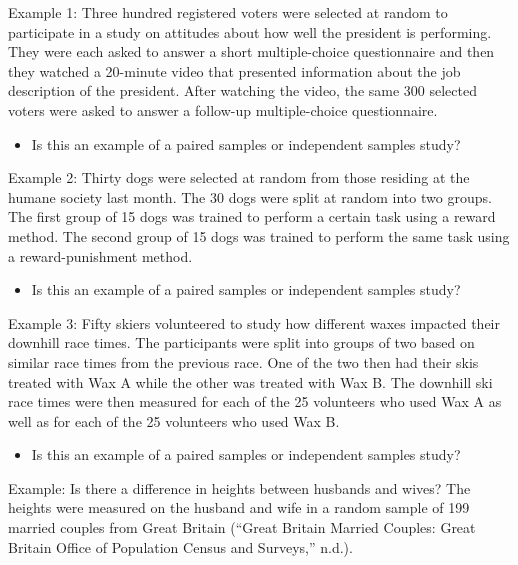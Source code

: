 \documentclass[
]{report}
\providecommand{\tightlist}{%
  \setlength{\itemsep}{0pt}\setlength{\parskip}{0pt}}
\begin{document}
Example 1: Three hundred registered voters were selected at random to participate in a study on attitudes about how well the president is performing. They were each asked to answer a short multiple-choice questionnaire and then they watched a 20-minute video that presented information about the job description of the president. After watching the video, the same 300 selected voters were asked to answer a follow-up multiple-choice questionnaire.

\begin{itemize}
\tightlist
\item
  Is this an example of a paired samples or independent samples study?
\end{itemize}

\vspace{0.3in}

\newpage

Example 2: Thirty dogs were selected at random from those residing at the humane society last month. The 30 dogs were split at random into two groups. The first group of 15 dogs was trained to perform a certain task using a reward method. The second group of 15 dogs was trained to perform the same task using a reward-punishment method.

\begin{itemize}
\tightlist
\item
  Is this an example of a paired samples or independent samples study?
\end{itemize}

\vspace{0.3in}

Example 3: Fifty skiers volunteered to study how different waxes impacted their downhill race times. The participants were split into groups of two based on similar race times from the previous race. One of the two then had their skis treated with Wax A while the other was treated with Wax B. The downhill ski race times were then measured for each of the 25 volunteers who used Wax A as well as for each of the 25 volunteers who used Wax B.

\begin{itemize}
\tightlist
\item
  Is this an example of a paired samples or independent samples study?
\end{itemize}

\vspace{0.3in}

Example: Is there a difference in heights between husbands and wives? The heights were measured on the husband and wife in a random sample of 199 married couples from Great Britain ({``Great Britain Married Couples: Great Britain Office of Population Census and Surveys,''} n.d.).
\end{document}
